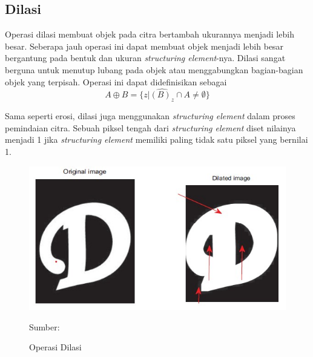     \subsection{Dilasi}
        Operasi dilasi membuat objek pada citra bertambah ukurannya menjadi lebih besar. Seberapa jauh operasi ini dapat membuat objek menjadi lebih besar bergantung pada bentuk dan ukuran \textit{structuring element}-nya. Dilasi sangat berguna untuk menutup lubang pada objek atau menggabungkan bagian-bagian objek yang terpisah. Operasi ini dapat didefinisikan sebagai
        \begin{equation}\label{eq:2.14}
        A \oplus B = \{z | \widehat{(B)_z} \cap A \neq \emptyset\}
        \end{equation}
        
        Sama seperti erosi, dilasi juga menggunakan \textit{structuring element} dalam proses pemindaian citra. Sebuah piksel tengah dari \textit{structuring element} diset nilainya menjadi 1 jika  \textit{structuring element} memiliki paling tidak satu piksel yang bernilai 1.
        \begin{figure}[H]
        \centering
          \singlespacing
          \includegraphics[width=12cm]{image/dilasi.jpg}
          \caption{Operasi Dilasi}
          \small{Sumber: \citet{Srisha2013}}
          \label{fig:Dilasi}
        \end{figure}
    
